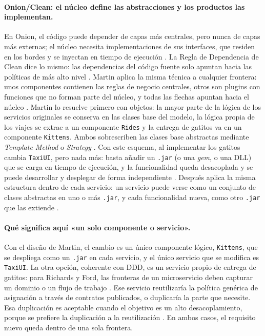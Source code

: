 \paragraph{Onion/Clean: el núcleo define las abstracciones y los productos las implementan.} En Onion,
el código puede depender de capas más centrales, pero nunca de capas más externas; el núcleo
necesita implementaciones de sus interfaces, que residen en los bordes y se inyectan en tiempo de
ejecución \parencite{palermo2008onion}. La Regla de Dependencia de Clean dice lo mismo: las
dependencias del código fuente solo apuntan hacia las políticas de más alto nivel
\parencite[p.~203]{martin2017clean}. Martin aplica la misma técnica a cualquier frontera: unos
componentes contienen las reglas de negocio centrales, otros son plugins con funciones que no forman
parte del núcleo, y todas las flechas apuntan hacia el núcleo \parencite[p.~173]{martin2017clean}.
Martin lo resuelve primero con objetos: la mayor parte de la lógica de los servicios originales se
conserva en las clases base del modelo, la lógica propia de los viajes se extrae a un componente
\texttt{Rides} y la entrega de gatitos va en un componente \texttt{Kittens}. Ambos sobrescriben las
clases base abstractas mediante \emph{Template Method} o \emph{Strategy}
\parencite[p.~244]{martin2017clean}. Con este esquema, al implementar los gatitos cambia
\texttt{TaxiUI}, pero nada más: basta añadir un \texttt{.jar} (o una \emph{gem}, o una DLL) que se
carga en tiempo de ejecución, y la funcionalidad queda desacoplada y se puede desarrollar y
desplegar de forma independiente \parencite[p.~244]{martin2017clean}. Después aplica la misma
estructura dentro de cada servicio: un servicio puede verse como un conjunto de clases abstractas en
uno o más \texttt{.jar}, y cada funcionalidad nueva, como otro \texttt{.jar} que las extiende
\parencite[pp.~245--246]{martin2017clean}.

\paragraph{Qué significa aquí «un solo componente o servicio».} Con el diseño de Martin, el cambio es
un único componente lógico, \texttt{Kittens}, que se despliega como un \texttt{.jar} en cada servicio,
y el único servicio que se modifica es \texttt{TaxiUI}. La otra opción, coherente con DDD, es un
servicio propio de entrega de gatitos: para Richards y Ford, las fronteras de un microservicio deben
capturar un dominio o un flujo de trabajo \parencite[cap.~17]{richards2020fundamentals}. Ese
servicio reutilizaría la política genérica de asignación a través de contratos publicados, o
duplicaría la parte que necesite. Esa duplicación es aceptable cuando el objetivo es un alto
desacoplamiento, porque se prefiere la duplicación a la reutilización
\parencite[cap.~17]{richards2020fundamentals}. En ambos casos, el requisito nuevo queda dentro de
una sola frontera.

